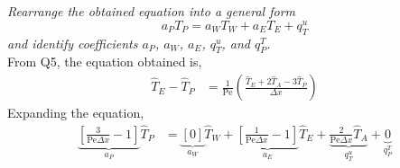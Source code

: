 \section{}
\textit{Rearrange the obtained equation into a general form}
\[
    a_P T_P = a_W T_W + a_E T_E + q_{T}^{u}
\]
\textit{and identify coefficients $a_P$, $a_W$, $a_E$, $q_{T}^{u}$, and $q_{P}^{T}$.}\\

From Q5, the equation obtained is,
\begin{align*}
    \hat{T}_E - \hat{T}_P &= \frac{1}{\text{Pe}} \left(\frac{\hat{T}_E + 2 \hat{T}_A - 3 \hat{T}_P}{\Delta x}\right) 
\end{align*}
Expanding the equation,
\begin{align*}
    \underbrace{\left[\frac{3}{\text{Pe} \Delta x} -1\right]}_{a_P}\hat{T}_P &= \underbrace{[0]}_{a_W}\hat{T}_W + \underbrace{\left[\frac{1}{\text{Pe} \Delta x} -1\right]}_{a_E}\hat{T}_E + \underbrace{\frac{2}{\text{Pe} \Delta x} \hat{T}_A}_{q_{T}^{u}} + \underbrace{0}_{q_{P}^{T}}
\end{align*}